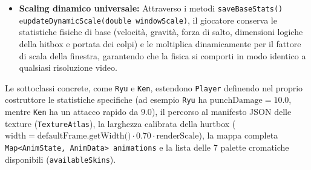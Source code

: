 \documentclass[11pt, a4paper]{article}
\begin{document}
\begin{itemize}
\begin{enumerate}
			\item \emph{Difesa (\texttt{isDefending}):} seleziona \texttt{BLOCK} o \texttt{CROUCH\_BLOCK};
			\item \emph{Postura e Movimento (\texttt{isCrouching}, \texttt{!isGrounded}, \texttt{isMoving}):} seleziona rispettivamente \texttt{CROUCH}, \texttt{JUMP} o \texttt{WALK};
			\item \emph{Stato di riposo:} imposta \texttt{MENU\_IDLE} (se nel menu di selezione) oppure \texttt{IDLE\_RIGHT/LEFT}.
		\end{enumerate}
		\item \textbf{Scaling dinamico universale:} Attraverso i metodi \texttt{saveBaseStats()} e\newline\texttt{updateDynamicScale(double windowScale)}, il giocatore conserva le statistiche fisiche di base (velocità, gravità, forza di salto, dimensioni logiche della hitbox e portata dei colpi) e le moltiplica dinamicamente per il fattore di scala della finestra, garantendo che la fisica si comporti in modo identico a qualsiasi risoluzione video.
	\end{itemize}
	
	Le sottoclassi concrete, come \texttt{Ryu} e \texttt{Ken}, estendono \texttt{Player} definendo nel proprio costruttore le statistiche specifiche (ad esempio \texttt{Ryu} ha $\text{punchDamage} = 10.0$, mentre \texttt{Ken} ha un attacco rapido da $9.0$), il percorso al manifesto JSON delle texture (\texttt{TextureAtlas}), la larghezza calibrata della hurtbox ($\text{width} = \text{defaultFrame.getWidth()} \cdot 0.70 \cdot \text{renderScale}$), la mappa completa \texttt{Map<AnimState, AnimData> animations} e la lista delle 7 palette cromatiche disponibili (\texttt{availableSkins}).
	
\end{document}
